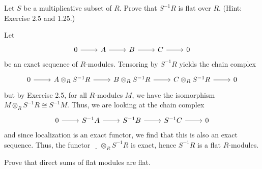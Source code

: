 \documentclass[../../master.tex]{subfiles}
\begin{document}
\begin{problem}
    Let $S$ be a multiplicative subset of $R$.
    Prove that $S^{-1}R$ is flat over $R$.
    (Hint: Exercise 2.5 and 1.25.)
\end{problem}

\begin{solution}
    Let
    \[
    \begin{tikzcd}
        0 & A & B & C & 0
        \arrow[from=1-1, to=1-2]
        \arrow[from=1-2, to=1-3]
        \arrow[from=1-3, to=1-4]
        \arrow[from=1-4, to=1-5] 
    \end{tikzcd}
    \]
    be an exact sequence of $R$-modules.
    Tensoring by $S^{-1}R$ yields the chain complex
    \[
    \begin{tikzcd}
        0 & A \otimes_R S^{-1}R & B \otimes_R S^{-1}R & C \otimes_R S^{-1}R & 0
        \arrow[from=1-1, to=1-2]
        \arrow[from=1-2, to=1-3]
        \arrow[from=1-3, to=1-4]
        \arrow[from=1-4, to=1-5] 
    \end{tikzcd}
    \]
    but by Exercise 2.5, for all $R$-modules $M$, we have the isomorphism $M \otimes_R S^{-1}R \cong S^{-1}M$.
    Thus, we are looking at the chain complex
    \[
    \begin{tikzcd}
        0 & S^{-1}A & S^{-1}B & S^{-1}C & 0
        \arrow[from=1-1, to=1-2]
        \arrow[from=1-2, to=1-3]
        \arrow[from=1-3, to=1-4]
        \arrow[from=1-4, to=1-5] 
    \end{tikzcd}
    \]
    and since localization is an exact functor, we find that this is also an exact sequence.
    Thus, the functor $\underline{\hspace{1em}} \otimes_R S^{-1}R$ is exact, hence $S^{-1}R$ is a flat $R$-modules.
\end{solution}

\begin{problem}
    Prove that direct sums of flat modules are flat.
\end{problem}
\end{document}
